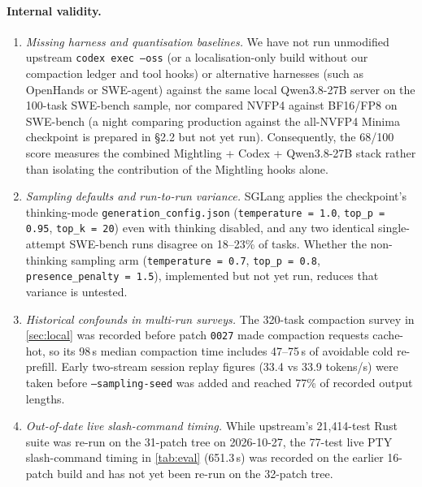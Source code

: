 \documentclass[11pt]{article}
\newcommand{\code}[1]{\texttt{#1}}
\begin{document}
\paragraph{Internal validity.}
\begin{enumerate}
\item \emph{Missing harness and quantisation baselines.} We have not run unmodified upstream
\code{codex exec --oss} (or a localisation-only build without our compaction ledger and tool hooks)
or alternative harnesses (such as OpenHands or SWE-agent) against the same local Qwen3.8-27B server
on the 100-task SWE-bench sample, nor compared NVFP4 against BF16/FP8 on SWE-bench (a night
comparing production against the all-NVFP4 Minima checkpoint is prepared in
 \S2.2 but not yet run). Consequently, the 68/100 score measures
the combined Mightling + Codex + Qwen3.8-27B stack rather than isolating the contribution of the
Mightling hooks alone.
\item \emph{Sampling defaults and run-to-run variance.} SGLang applies the checkpoint's
thinking-mode \code{generation\_config.json} (\code{temperature = 1.0}, \code{top\_p = 0.95},
\code{top\_k = 20}) even with thinking disabled, and any two identical single-attempt SWE-bench runs
disagree on 18--23\% of tasks. Whether the non-thinking sampling arm (\code{temperature = 0.7},
\code{top\_p = 0.8}, \code{presence\_penalty = 1.5}), implemented but not yet run, reduces that
variance is untested.
\item \emph{Historical confounds in multi-run surveys.} The 320-task compaction survey in
\cref{sec:local} was recorded before patch \code{0027} made compaction requests cache-hot, so its
98\,s median compaction time includes 47--75\,s of avoidable cold re-prefill. Early two-stream
session replay figures (33.4 vs 33.9 tokens/s) were taken before \code{--sampling-seed} was added
and reached 77\% of recorded output lengths.
\item \emph{Out-of-date live slash-command timing.} While upstream's 21{,}414-test Rust suite was
re-run on the 31-patch tree on 2026-10-27, the 77-test live PTY slash-command timing in
\cref{tab:eval} (651.3\,s) was recorded on the earlier 16-patch build and has not yet been re-run
on the 32-patch tree.
\end{enumerate}
\end{document}
